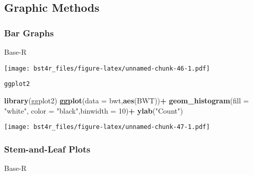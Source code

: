 \documentclass[12pt,]{article}
\newenvironment{Shaded}{\begin{snugshade}}{\end{snugshade}}
\newcommand{\DataTypeTok}[1]{\textcolor[rgb]{0.13,0.29,0.53}{#1}}
\newcommand{\DecValTok}[1]{\textcolor[rgb]{0.00,0.00,0.81}{#1}}
\newcommand{\KeywordTok}[1]{\textcolor[rgb]{0.13,0.29,0.53}{\textbf{#1}}}
\newcommand{\NormalTok}[1]{#1}
\newcommand{\OperatorTok}[1]{\textcolor[rgb]{0.81,0.36,0.00}{\textbf{#1}}}
\newcommand{\StringTok}[1]{\textcolor[rgb]{0.31,0.60,0.02}{#1}}
\begin{document}
\hypertarget{htmlwidget-2da307c05171c0352607}{}

\hypertarget{graphic-methods}{%
\subsection{Graphic Methods}\label{graphic-methods}}

\hypertarget{bar-graphs}{%
\subsubsection{Bar Graphs}\label{bar-graphs}}

Base-R

\begin{Shaded}
\end{Shaded}

\texttt{[image: bst4r\_files/figure-latex/unnamed-chunk-46-1.pdf]}

\texttt{ggplot2}

\begin{Shaded}
\begin{Highlighting}[]
\KeywordTok{library}\NormalTok{(ggplot2)}
 \KeywordTok{ggplot}\NormalTok{(}\DataTypeTok{data =}\NormalTok{ bwt,}\KeywordTok{aes}\NormalTok{(BWT))}\OperatorTok{+}
\StringTok{  }\KeywordTok{geom_histogram}\NormalTok{(}\DataTypeTok{fill =} \StringTok{"white"}\NormalTok{, }\DataTypeTok{color =} \StringTok{"black"}\NormalTok{,}\DataTypeTok{binwidth =} \DecValTok{10}\NormalTok{)}\OperatorTok{+}
\StringTok{  }\KeywordTok{ylab}\NormalTok{(}\StringTok{"Count"}\NormalTok{)}
\end{Highlighting}
\end{Shaded}

\texttt{[image: bst4r\_files/figure-latex/unnamed-chunk-47-1.pdf]}

\hypertarget{stem-and-leaf-plots}{%
\subsubsection{Stem-and-Leaf Plots}\label{stem-and-leaf-plots}}

Base-R

\begin{Shaded}
\end{Shaded}
\end{document}
